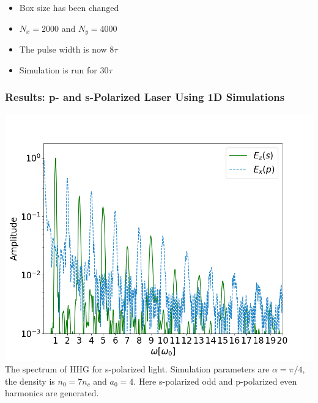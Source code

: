 \documentclass{beamer}
\begin{document}
\begin{frame}
    \begin{minipage}[t]{0.34\linewidth}
        \begin{center}
            \begin{itemize}
                \item Box size has been changed
                \item $N_x = 2000$ and $N_y = 4000$
                \item The pulse width is now $8\tau$
                \item Simulation is run for $30\tau$
            \end{itemize}
        \end{center}
    \end{minipage}
\end{frame}

\begin{frame}
    \frametitle{Results: p- and s-Polarized Laser Using 1D Simulations}
    \begin{minipage}[h]{0.48\linewidth}
        \centering
        \includegraphics[width=1\textwidth, height=0.60\textheight]{images/s_fft.png}
        \scriptsize{The spectrum of HHG for s-polarized light. Simulation parameters are $\alpha = \pi/4$, the density is $n_0 = 7n_c$ and $a_0 = 4$. Here s-polarized odd and p-polarized even harmonics are generated.}
        \label{fig:s-fft}
    \end{minipage}
    \begin{minipage}[h]{0.48\linewidth}
        \centering

\end{minipage}
\end{frame}
\end{document}
